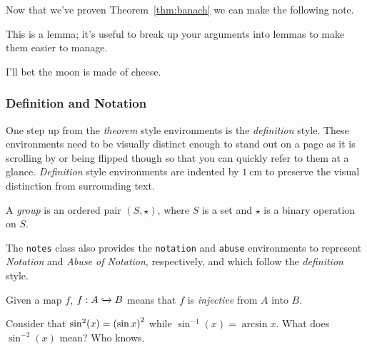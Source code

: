 \documentclass[diagram]{notes}
\begin{document}
\begin{corollary}
Now that we've proven Theorem~\ref{thm:banach} we can make the following note.
\end{corollary}
\begin{lemma}
This is a lemma; it's useful to break up your arguments into lemmas to make them easier to manage.
\end{lemma}
\begin{conjecture}
I'll bet the moon is made of cheese.
\end{conjecture}

\subsubsection{Definition and Notation}
One step up from the \emph{theorem} style environments is the \emph{definition} style. These environments need to be visually distinct enough to stand out on a page as it is scrolling by or being flipped though so that you can quickly refer to them at a glance. \emph{Definition} style environments are indented by $\SI{1}{\centi\meter}$ to preserve the visual distinction from surrounding text.

\begin{definition}[Group]
A \emph{group} is an ordered pair $(S, \star)$, where $S$ is a set and $\star$ is a binary operation on $S$.
\end{definition}

The \texttt{notes} class also provides the \texttt{notation} and \texttt{abuse} environments to represent \emph{Notation} and \emph{Abuse of Notation}, respectively, and which follow the \emph{definition} style.

\begin{notation}[$\xhookrightarrow{}$]
Given a map $f$, $f : A \xhookrightarrow{} B$ means that $f$ is \emph{injective} from $A$ into $B$.
\end{notation}

\begin{abuse}
Consider that $\sin^2(x) = \qty(\sin x)^2$ while $\sin^{-1}(x) = \arcsin x$. What does $\sin^{-2}(x)$ mean? Who knows.
\end{abuse}
\end{document}
